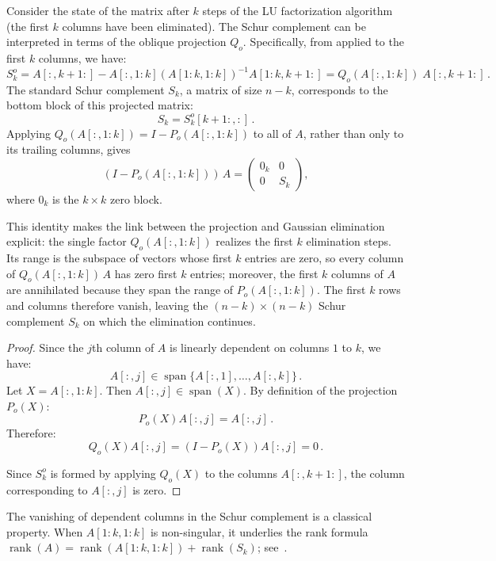 \documentclass[final]{siamart1116}
\numberwithin{theorem}{section}
\DeclareMathOperator{\rk}{rank}
\DeclareMathOperator{\spn}{span}
\begin{document}
Consider the state of the matrix after $k$ steps of the LU factorization algorithm (the first $k$ columns have been eliminated). The Schur complement can be interpreted in terms of the oblique projection $Q_o$. Specifically, from  applied to the first $k$ columns, we have:
\[ S^o_k = A[:,k+1:] - A[:,1:k] {(A[1:k,1:k])}^{-1} A[1:k,k+1:]
  = Q_o(A[:,1:k]) \; A[:,k+1:] \,.
\]
The standard Schur complement $S_k$, a matrix of size $n-k$, corresponds to the bottom block of this projected matrix:
\[ S_k = S^o_k[k+1:,:] \,. \]
Applying $Q_o(A[:,1:k]) = I - P_o(A[:,1:k])$ to all of $A$, rather than only to its trailing columns, gives
\[ (I - P_o(A[:,1:k])) \, A =
  \begin{pmatrix}
    0_k & 0   \\
    0   & S_k
  \end{pmatrix},
\]
where $0_k$ is the $k \times k$ zero block.

This identity makes the link between the projection and Gaussian elimination explicit: the single factor $Q_o(A[:,1:k])$ realizes the first $k$ elimination steps. Its range is the subspace of vectors whose first $k$ entries are zero, so every column of $Q_o(A[:,1:k])\,A$ has zero first $k$ entries; moreover, the first $k$ columns of $A$ are annihilated because they span the range of $P_o(A[:,1:k])$. The first $k$ rows and columns therefore vanish, leaving the $(n-k) \times (n-k)$ Schur complement $S_k$ on which the elimination continues.


\begin{proof}
  Since the $j$th column of $A$ is linearly dependent on columns $1$ to $k$, we have:
  \[ A[:,j] \in \spn\{ A[:,1], \ldots, A[:,k] \} \,. \] %
  Let $X = A[:,1:k]$. Then $A[:,j] \in \spn(X)$. By definition of the projection $P_o(X)$:
  \[ P_o(X) A[:,j] = A[:,j] \,. \]
  Therefore:
  \[ Q_o(X) A[:,j] = (I - P_o(X)) A[:,j] = 0 \,. \]

  Since $S^o_k$ is formed by applying $Q_o(X)$ to the columns $A[:,k+1:]$, the column corresponding to $A[:,j]$ is zero.
\end{proof}

The vanishing of dependent columns in the Schur complement is a classical property. When $A[1:k,1:k]$ is non-singular, it underlies the rank formula $\rk(A) = \rk(A[1:k,1:k]) + \rk(S_k)$; see~\cite{Marsaglia_1974,Carlson_1986,Cottle_1974}.
\end{document}
